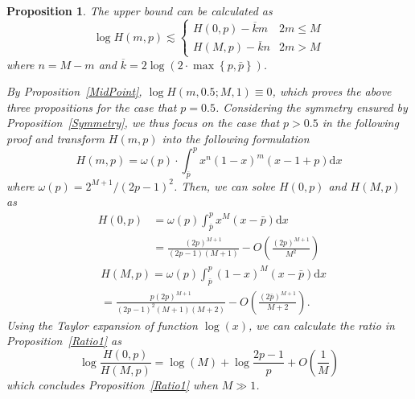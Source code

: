 \documentclass{article}
\makeatletter
\newtheorem{proposition}[theorem]{Proposition}
\renewenvironment{proof}[1][\proofname]{\par
  \vspace{-\topsep}%
  \pushQED{\qed}%
  \normalfont
  \topsep0pt \partopsep0pt %
  \trivlist
  \item[\hskip\labelsep
        \itshape
    #1\@addpunct{.}]\ignorespaces
}{%
  \popQED\endtrivlist\@endpefalse
  \addvspace{0pt plus 0pt} %
}
\makeatother
\begin{document}
\begin{proposition}
\label{UpBound1}
The upper bound can be calculated as
\begin{equation*}
\log H(m,p)\lesssim \left\{
    \begin{array}{cl}
    H(0,p)- \overline{k}m& 2m\leq M\\
    H(M,p)- \overline{k}n& 2m>M
    \end{array}\right.
\end{equation*}
where $n=M-m$ and $\overline{k}=2\log\left(2\cdot \max\left\{p,\bar{p}\right\}\right)$.
\begin{proof}
By Proposition~\ref{MidPoint}, $\log H(m, 0.5;M,1)\equiv 0$, which proves the above three propositions for the case that $p=0.5$. Considering the symmetry ensured by Proposition~\ref{Symmetry}, we thus focus on the case that $p>0.5$ in the following proof and transform $H(m,p)$ into the following formulation
\begin{equation}
H(m,p)=\omega(p)\cdot \int_{\bar{p}}^{p}x^n(1-x)^m(x-1+p)\mathrm{d}x
\end{equation}
where $\omega(p)=2^{M+1}/(2p-1)^2$. Then, we can solve $H(0,p)$ and $H(M,p)$ as
\begin{equation}
\begin{split}
H(0,p)&=\omega(p)\int_{\bar{p}}^{p}x^M(x-\bar{p})\mathrm{d}x\\
&=\frac{(2p)^{M+1}}{(2p-1)(M+1)} - O\left(\frac{(2p)^{M+1}}{M^2}\right)
\end{split}
\end{equation}
\begin{equation}
\begin{split}
&H(M,p)=\omega(p)\int_{\bar{p}}^{p}(1-x)^M(x-\bar{p})\mathrm{d}x\\
&=\frac{p(2p)^{M+1}}{(2p-1)^2(M+1)(M+2)} - O\left(\frac{(2\bar{p})^{M+1}}{M+2}\right).
\end{split}
\end{equation}
Using the Taylor expansion of function $\log(x)$, we can calculate the ratio in Proposition~\ref{Ratio1} as
\begin{equation}
\log\frac{H(0,p)}{H(M,p)}=\log(M)+\log\frac{2p-1}{p}+O\left(\frac{1}{M}\right)
\end{equation}
which concludes Proposition~\ref{Ratio1} when $M\gg 1$.


\end{proof}
\end{proposition}
\end{document}
